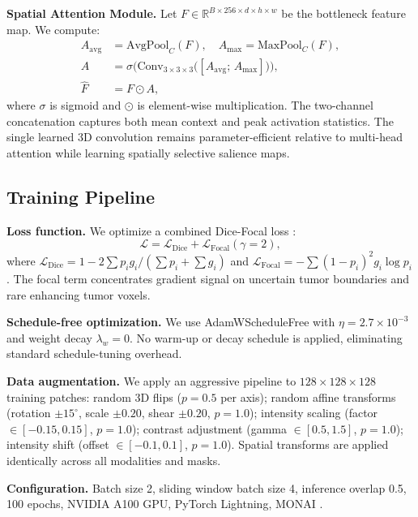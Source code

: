 \documentclass[conference]{IEEEtran}
\begin{document}
\textbf{Spatial Attention Module.} Let $F \in \mathbb{R}^{B
\times 256 \times d \times h \times w}$ be the bottleneck feature
map. We compute:
\begin{align}
  A_{\text{avg}} &= \text{AvgPool}_{C}(F), \quad
  A_{\text{max}} = \text{MaxPool}_{C}(F), \\
  A &= \sigma\!\bigl(\text{Conv}_{3\times3\times3}
       \bigl([A_{\text{avg}};\,A_{\text{max}}]\bigr)\bigr), \\
  \hat{F} &= F \odot A,
\end{align}
where $\sigma$ is sigmoid and $\odot$ is element-wise
multiplication. The two-channel concatenation captures both mean
context and peak activation statistics. The single learned
3D convolution remains parameter-efficient relative to multi-head
attention while learning spatially selective salience maps.

\subsection{Training Pipeline}

\textbf{Loss function.} We optimize a combined Dice-Focal loss
\cite{b11,b17}:
\begin{equation}
  \mathcal{L} = \mathcal{L}_{\text{Dice}}
              + \mathcal{L}_{\text{Focal}}(\gamma=2),
\end{equation}
where $\mathcal{L}_{\text{Dice}} = 1 - 2\sum p_i g_i /
(\sum p_i + \sum g_i)$ and $\mathcal{L}_{\text{Focal}} =
{-}\sum (1{-}p_i)^2 g_i \log p_i$. The focal term concentrates
gradient signal on uncertain tumor boundaries and rare enhancing
tumor voxels.

\textbf{Schedule-free optimization.} We use AdamWScheduleFree
\cite{b6} with $\eta = 2.7{\times}10^{-3}$ and weight decay
$\lambda_w = 0$. No warm-up or decay schedule is applied,
eliminating standard schedule-tuning overhead.

\textbf{Data augmentation.} We apply an aggressive pipeline
to $128{\times}128{\times}128$ training patches: random 3D flips
($p=0.5$ per axis); random affine transforms (rotation
$\pm15^\circ$, scale $\pm0.20$, shear $\pm0.20$, $p=1.0$);
intensity scaling (factor $\in [{-}0.15,0.15]$, $p=1.0$);
contrast adjustment (gamma $\in [0.5,1.5]$, $p=1.0$); intensity
shift (offset $\in [{-}0.1,0.1]$, $p=1.0$). Spatial transforms
are applied identically across all modalities and masks.

\textbf{Configuration.} Batch size 2, sliding window batch size 4,
inference overlap 0.5, 100 epochs, NVIDIA A100 GPU, PyTorch
Lightning, MONAI \cite{b16}.
\end{document}
